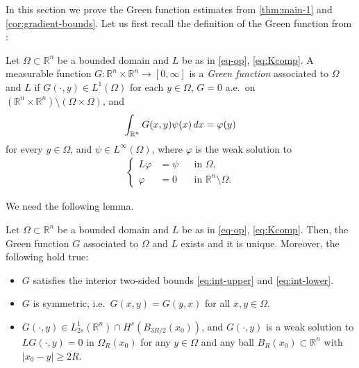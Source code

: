 \documentclass[11pt,reqno]{amsart}
\theoremstyle{plain}
\theoremstyle{definition}
\numberwithin{equation}{section}
\newcommand{\R}{\mathbb{R}}
\newcommand{\1}{\mathbbm{1}}
\renewcommand{\d}{\textnormal{\,d}}
\begin{document}
In this section we prove the Green function estimates from \autoref{thm:main-1} and \autoref{cor:gradient-bounds}. Let us first recall the definition of the Green function from \cite{KKL23}:
\begin{definition}
\label{def:Green}
    Let $\Omega \subset \R^n$ be a bounded domain and $L$ be as in \eqref{eq-op}, \eqref{eq:Kcomp}. A measurable function $G: \R^n \times \R^n \to [0, \infty]$ is a \emph{Green function} associated to $\Omega$ and $L$ if $G(\cdot, y) \in L^1(\Omega)$ for each $y \in \Omega$, $G=0$ a.e.\ on $(\R^n \times \R^n) \setminus (\Omega \times \Omega)$, and
    \begin{align*}
        \int_{\R^n} G(x, y) \psi(x) \d x = \varphi(y)
    \end{align*}
    for every $y \in \Omega$, and $\psi \in L^{\infty}(\Omega)$, where $\varphi$ is the weak solution to 
\begin{align*}
\left\{
\begin{aligned}
L \varphi &= \psi &&\text{in } \Omega,\\
\varphi &= 0 &&\text{in } \R^n \setminus \Omega.
\end{aligned}
\right.
\end{align*}
\end{definition}

We need the following lemma.

\begin{lemma}
\label{lemma:Green-aux}
    Let $\Omega \subset \R^n$ be a bounded domain and $L$ be as in \eqref{eq-op}, \eqref{eq:Kcomp}. Then, the Green function $G$ associated to $\Omega$ and $L$ exists and it is unique. Moreover, the following hold true:
    \begin{itemize}
        \item $G$ satisfies the interior two-sided bounds \eqref{eq:int-upper} and \eqref{eq:int-lower}.
        \item $G$ is symmetric, i.e.\ $G(x,y) = G(y,x)$ for all $x,y \in \Omega$.
        \item $G(\cdot,y) \in L^1_{2s}(\R^n) \cap H^s(B_{3R/2}(x_0))$, and $G(\cdot,y)$ is a weak solution to $L G(\cdot,y) = 0$ in $\Omega_R(x_0)$ for any $y \in \Omega$ and any ball $B_R(x_0) \subset \R^n$ with $|x_0 - y| \ge 2R$.
    \end{itemize}
\end{lemma}
\end{document}
